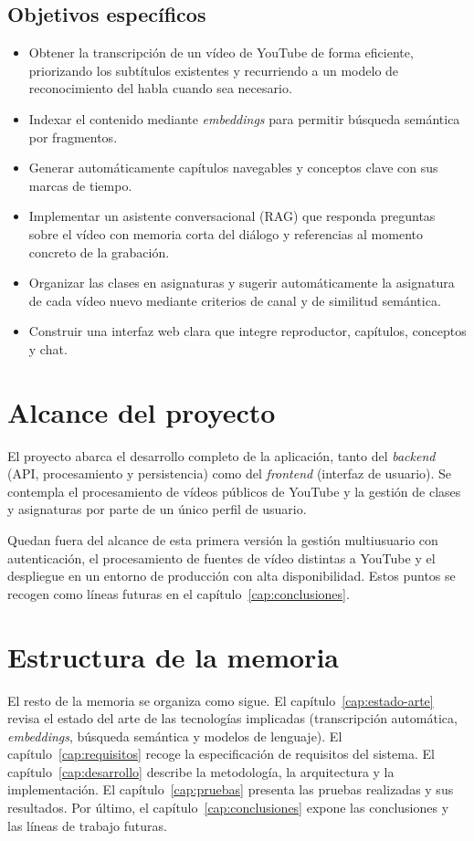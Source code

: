 \subsection{Objetivos específicos}

\begin{itemize}
  \item Obtener la transcripción de un vídeo de YouTube de forma eficiente, priorizando los
        subtítulos existentes y recurriendo a un modelo de reconocimiento del habla cuando sea
        necesario.
  \item Indexar el contenido mediante \textit{embeddings} para permitir búsqueda semántica por
        fragmentos.
  \item Generar automáticamente capítulos navegables y conceptos clave con sus marcas de tiempo.
  \item Implementar un asistente conversacional (RAG) que responda preguntas sobre el vídeo con
        memoria corta del diálogo y referencias al momento concreto de la grabación.
  \item Organizar las clases en asignaturas y sugerir automáticamente la asignatura de cada
        vídeo nuevo mediante criterios de canal y de similitud semántica.
  \item Construir una interfaz web clara que integre reproductor, capítulos, conceptos y chat.
\end{itemize}

\section{Alcance del proyecto}

El proyecto abarca el desarrollo completo de la aplicación, tanto del \textit{backend} (API,
procesamiento y persistencia) como del \textit{frontend} (interfaz de usuario). Se contempla el
procesamiento de vídeos públicos de YouTube y la gestión de clases y asignaturas por parte de un
único perfil de usuario.

Quedan fuera del alcance de esta primera versión la gestión multiusuario con autenticación, el
procesamiento de fuentes de vídeo distintas a YouTube y el despliegue en un entorno de
producción con alta disponibilidad. Estos puntos se recogen como líneas futuras en el
capítulo~\ref{cap:conclusiones}.

\section{Estructura de la memoria}

El resto de la memoria se organiza como sigue. El capítulo~\ref{cap:estado-arte} revisa el
estado del arte de las tecnologías implicadas (transcripción automática, \textit{embeddings},
búsqueda semántica y modelos de lenguaje). El capítulo~\ref{cap:requisitos} recoge la
especificación de requisitos del sistema. El capítulo~\ref{cap:desarrollo} describe la
metodología, la arquitectura y la implementación. El capítulo~\ref{cap:pruebas} presenta las
pruebas realizadas y sus resultados. Por último, el capítulo~\ref{cap:conclusiones} expone las
conclusiones y las líneas de trabajo futuras.
